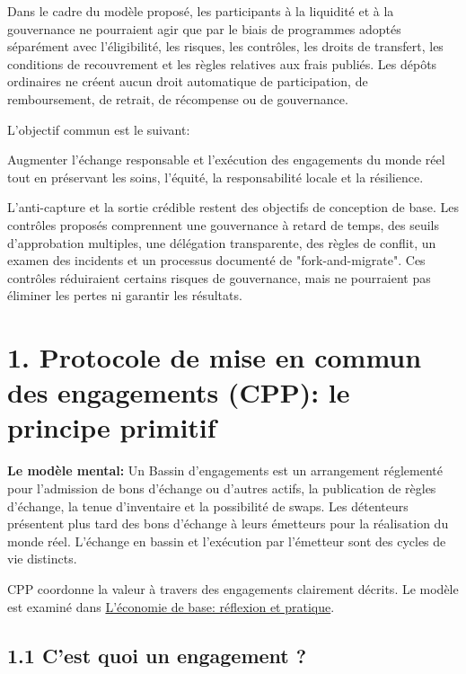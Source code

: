 \documentclass[11pt]{article}
\begin{document}
Dans le cadre du modèle proposé, les participants à la liquidité et à la gouvernance ne pourraient agir que par le biais de programmes adoptés séparément avec l'éligibilité, les risques, les contrôles, les droits de transfert, les conditions de recouvrement et les règles relatives aux frais publiés. Les dépôts ordinaires ne créent aucun droit automatique de participation, de remboursement, de retrait, de récompense ou de gouvernance.

L'objectif commun est le suivant:

Augmenter l'échange responsable et l'exécution des engagements du monde réel tout en préservant les soins, l'équité, la responsabilité locale et la résilience.

L'anti-capture et la sortie crédible restent des objectifs de conception de base. Les contrôles proposés comprennent une gouvernance à retard de temps, des seuils d'approbation multiples, une délégation transparente, des règles de conflit, un examen des incidents et un processus documenté de "fork-and-migrate". Ces contrôles réduiraient certains risques de gouvernance, mais ne pourraient pas éliminer les pertes ni garantir les résultats.


\section*{1. Protocole de mise en commun des engagements (CPP): le principe primitif}

\textbf{Le modèle mental:} Un Bassin d'engagements est un arrangement réglementé pour l'admission de bons d'échange ou d'autres actifs, la publication de règles d'échange, la tenue d'inventaire et la possibilité de swaps. Les détenteurs présentent plus tard des bons d'échange à leurs émetteurs pour la réalisation du monde réel. L'échange en bassin et l'exécution par l'émetteur sont des cycles de vie distincts.

CPP coordonne la valeur à travers des engagements clairement décrits. Le modèle est examiné dans \href{https://willruddick.substack.com/p/grassroots-economics-the-book-is}{L'économie de base: réflexion et pratique}.

\subsection*{1.1 C'est quoi un engagement ?}
\end{document}
